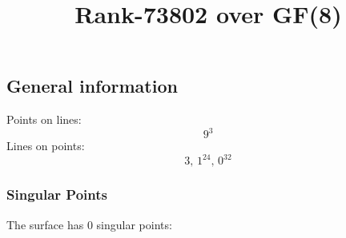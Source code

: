 \documentclass{article}
\newcommand\setTBstruts{\def\T{\rule{0pt}{2.6ex}}%
\def\B{\rule[-1.2ex]{0pt}{0pt}}}
\begin{document}
 
\setTBstruts



{\allowdisplaybreaks%






\title{Rank-73802 over GF(8)}
\author{}%
\maketitle%
%
{}



\subsection*{General information}
Points on lines:
$$
9^3$$
Lines on points:
$$
3,\,1^{24},\,0^{32}$$
\subsubsection*{Singular Points}
The surface has 0 singular points:\\
\begin{align*}
\end{align*}
}
\end{document}
